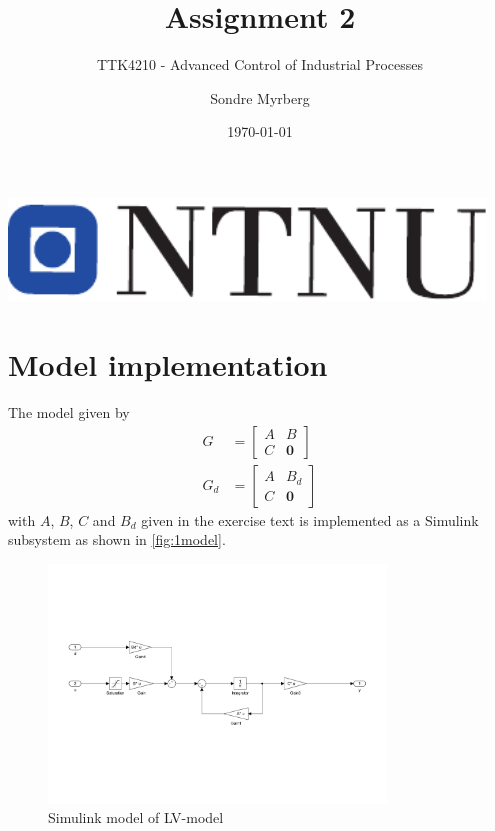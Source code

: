 \documentclass[a4paper]{scrartcl}
\title{Assignment 2}
\subtitle{TTK4210 - Advanced Control of Industrial Processes}
\author{Sondre Myrberg}
\date{\today}
\begin{document}
\hypersetup{pageanchor=false}
\begin{titlepage}
    \maketitle
    \vfill
    \vfill
    \vfill
    \vfill
    \vfill
    \includegraphics[width=0.95\textwidth]{../ntnu_logo.pdf}
    \vfill
    \vfill
\end{titlepage}
\hypersetup{pageanchor=true}

\section{Model implementation}
The model given by
\begin{equation}
	\begin{aligned}
		G &= \left[
		\begin{array}{c|c}
			A & B \\
			\hline
			C & \bm{0}
		\end{array}
		\right]
		\\
		G_d &= \left[
		\begin{array}{c|c}
			A & B_d \\
			\hline
			C & \bm{0}
		\end{array}
		\right]
	\end{aligned}
\end{equation}
with $A$, $B$, $C$ and $B_d$ given in the exercise text is implemented as a Simulink subsystem as shown in \autoref{fig:1model}.
\begin{figure}[ht!]
	\centering
	\includegraphics[width=0.8\textwidth]{fig/LV.pdf}
	\caption{Simulink model of LV-model}
	\label{fig:1model}
\end{figure}
\end{document}
